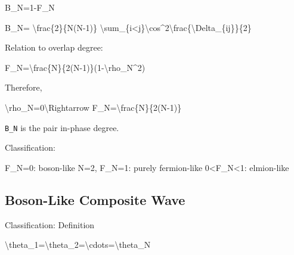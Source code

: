 \documentclass[
  a4paper,
]{article}
\newenvironment{Shaded}{}{}
\newcommand{\NormalTok}[1]{#1}
\begin{document}
\begin{Shaded}
\begin{Highlighting}[]
\NormalTok{B\_N=1{-}F\_N}
\end{Highlighting}
\end{Shaded}

\begin{Shaded}
\begin{Highlighting}[]
\NormalTok{B\_N=}
\NormalTok{\textbackslash{}frac\{2\}\{N(N{-}1)\}}
\NormalTok{\textbackslash{}sum\_\{i\textless{}j\}\textbackslash{}cos\^{}2\textbackslash{}frac\{\textbackslash{}Delta\_\{ij\}\}\{2\}}
\end{Highlighting}
\end{Shaded}

Relation to overlap degree:

\begin{Shaded}
\begin{Highlighting}[]
\NormalTok{F\_N=\textbackslash{}frac\{N\}\{2(N{-}1)\}(1{-}\textbackslash{}rho\_N\^{}2)}
\end{Highlighting}
\end{Shaded}

Therefore,

\begin{Shaded}
\begin{Highlighting}[]
\NormalTok{\textbackslash{}rho\_N=0\textbackslash{}Rightarrow F\_N=\textbackslash{}frac\{N\}\{2(N{-}1)\}}
\end{Highlighting}
\end{Shaded}

\texttt{B\_N} is the pair in-phase degree.

Classification:

\begin{Shaded}
\begin{Highlighting}[]
\NormalTok{F\_N=0: boson{-}like}
\NormalTok{N=2, F\_N=1: purely fermion{-}like}
\NormalTok{0\textless{}F\_N\textless{}1: elmion{-}like}
\end{Highlighting}
\end{Shaded}

\subsection{Boson-Like Composite Wave}\label{boson-like-composite-wave}

Classification: Definition

\begin{Shaded}
\begin{Highlighting}[]
\NormalTok{\textbackslash{}theta\_1=\textbackslash{}theta\_2=\textbackslash{}cdots=\textbackslash{}theta\_N}
\end{Highlighting}
\end{Shaded}
\end{document}
